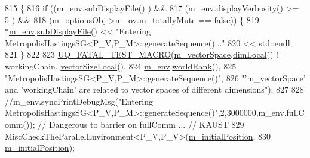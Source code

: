 \begin{DoxyCode}
815 \{
816   \textcolor{keywordflow}{if} ((\hyperlink{class_q_u_e_s_o_1_1_metropolis_hastings_s_g_ac8ea061e55b920e0c8f9bce5c3f20e52}{m\_env}.\hyperlink{class_q_u_e_s_o_1_1_base_environment_a8a0064746ae8dddfece4229b9ad374d6}{subDisplayFile}()                   ) &&
817       (\hyperlink{class_q_u_e_s_o_1_1_metropolis_hastings_s_g_ac8ea061e55b920e0c8f9bce5c3f20e52}{m\_env}.\hyperlink{class_q_u_e_s_o_1_1_base_environment_a1fe5f244fc0316a0ab3e37463f108b96}{displayVerbosity}() >= 5            ) &&
818       (\hyperlink{class_q_u_e_s_o_1_1_metropolis_hastings_s_g_a5d0bc9f73d50d272aa6bfb5ef5939ef3}{m\_optionsObj}->\hyperlink{class_q_u_e_s_o_1_1_metropolis_hastings_s_g_options_a9d4792d9fc2dc5439b8ab489b0c236eb}{m\_ov}.\hyperlink{class_q_u_e_s_o_1_1_mh_options_values_af812309e81191e88dfdc87c5815141a3}{m\_totallyMute} == \textcolor{keyword}{false})) \{
819     *\hyperlink{class_q_u_e_s_o_1_1_metropolis_hastings_s_g_ac8ea061e55b920e0c8f9bce5c3f20e52}{m\_env}.\hyperlink{class_q_u_e_s_o_1_1_base_environment_a8a0064746ae8dddfece4229b9ad374d6}{subDisplayFile}() << \textcolor{stringliteral}{"Entering
       MetropolisHastingsSG<P\_V,P\_M>::generateSequence()..."}
820                             << std::endl;
821   \}
822 
823   \hyperlink{_defines_8h_a56d63d18d0a6d45757de47fcc06f574d}{UQ\_FATAL\_TEST\_MACRO}(\hyperlink{class_q_u_e_s_o_1_1_metropolis_hastings_s_g_a2ef17fbfc6a156f03bbfad044b5a75f5}{m\_vectorSpace}.\hyperlink{class_q_u_e_s_o_1_1_vector_space_a5829a1f4f996f8307c840b705144d666}{dimLocal}() != workingChain.
      \hyperlink{class_q_u_e_s_o_1_1_base_vector_sequence_a2fefedf9e5b90f22881103b3f92555f6}{vectorSizeLocal}(),
824                       \hyperlink{class_q_u_e_s_o_1_1_metropolis_hastings_s_g_ac8ea061e55b920e0c8f9bce5c3f20e52}{m\_env}.\hyperlink{class_q_u_e_s_o_1_1_base_environment_a78b57112bbd0e6dd0e8afec00b40ffa7}{worldRank}(),
825                       \textcolor{stringliteral}{"MetropolisHastingsSG<P\_V,P\_M>::generateSequence()"},
826                       \textcolor{stringliteral}{"'m\_vectorSpace' and 'workingChain' are related to vector spaces of different
       dimensions"});
827 
828   \textcolor{comment}{//m\_env.syncPrintDebugMsg("Entering
       MetropolisHastingsSG<P\_V,P\_M>::generateSequence()",2,3000000,m\_env.fullComm());  // Dangerous to barrier on fullComm ... // KAUST}
829   MiscCheckTheParallelEnvironment<P\_V,P\_V>(\hyperlink{class_q_u_e_s_o_1_1_metropolis_hastings_s_g_ae29f5d1198228858283d733021da2b14}{m\_initialPosition},
830                                              \hyperlink{class_q_u_e_s_o_1_1_metropolis_hastings_s_g_ae29f5d1198228858283d733021da2b14}{m\_initialPosition});

\end{DoxyCode}
